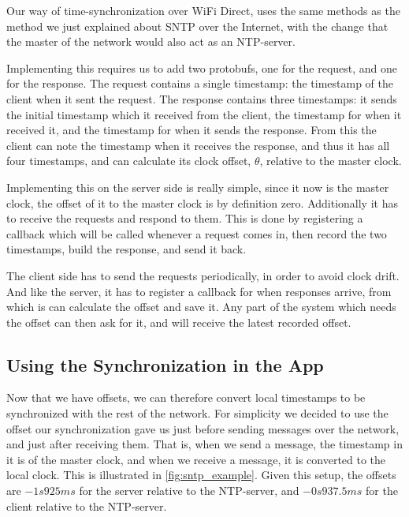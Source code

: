 Our way of time-synchronization over WiFi Direct, uses the same methods as the method we just explained about \ac{SNTP} over the Internet, with the change that the master of the network would also act as an \ac{NTP}-server.

Implementing this requires us to add two protobufs, one for the request, and one for the response.
The request contains a single timestamp: the timestamp of the client when it sent the request.
The response contains three timestamps: it sends the initial timestamp which it received from the client, the timestamp for when it received it, and the timestamp for when it sends the response.
From this the client can note the timestamp when it receives the response, and thus it has all four timestamps, and can calculate its clock offset, $\theta$, relative to the master clock.

Implementing this on the server side is really simple, since it now is the master clock, the offset of it to the master clock is by definition zero.
Additionally it has to receive the requests and respond to them.
This is done by registering a callback which will be called whenever a request comes in, then record the two timestamps, build the response, and send it back.

The client side has to send the requests periodically, in order to avoid clock drift.
And like the server, it has to register a callback for when responses arrive, from which is can calculate the offset and save it.
Any part of the system which needs the offset can then ask for it, and will receive the latest recorded offset.

\subsection{Using the Synchronization in the App}
Now that we have offsets, we can therefore convert local timestamps to be synchronized with the rest of the network.
For simplicity we decided to use the offset our synchronization gave us just before sending messages over the network, and just after receiving them.
That is, when we send a message, the timestamp in it is of the master clock, and when we receive a message, it is converted to the local clock.
This is illustrated in \ref{fig:sntp_example}.
Given this setup, the offsets are $-1s925ms$ for the server relative to the \ac{NTP}-server, and $-0s937.5ms$ for the client relative to the \ac{NTP}-server.

